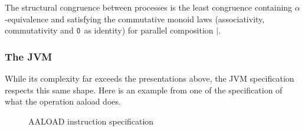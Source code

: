 The structural congruence between processes is the least congruence
containing $\alpha$-equivalence and satisfying the commutative monoid
laws (associativity, commutativity and $\mathsf{0}$ as identity) for
parallel composition $|$.


\pagebreak
\subsubsection{The JVM}

While its complexity far exceeds the presentations above, the JVM specification respects this same shape. Here is an example from one of the specification of what the operation aaload does.

\begin{figure}[h!]
  \caption{AALOAD instruction specification}
  \label{fig:AALOADSpec}
\end{figure}

